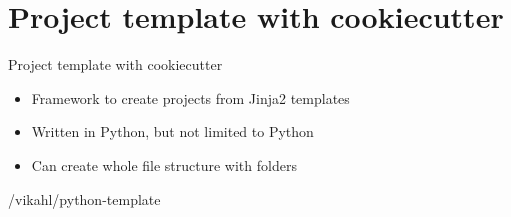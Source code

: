 \section{Project template with cookiecutter}

\begin{frame}{Project template with cookiecutter}
  \begin{itemize}
    \item Framework to create projects from Jinja2 templates
    \item Written in Python, but not limited to Python
    \item Can create whole file structure with folders
  \end{itemize}

  /vikahl/python-template
\end{frame}
